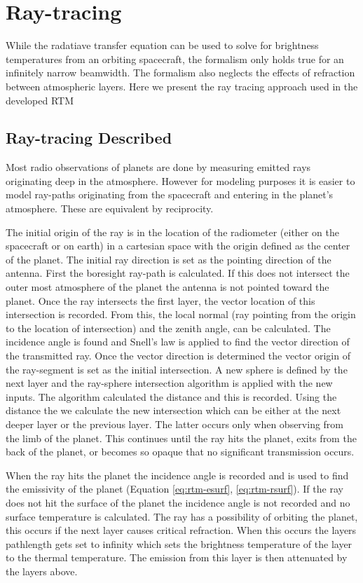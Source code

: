 \section{Ray-tracing}
While the radatiave transfer equation can be used to solve for brightness temperatures from an orbiting spacecraft, the formalism only holds true for an infinitely narrow beamwidth. The formalism also neglects the effects of refraction between atmospheric layers. Here we present the ray tracing approach used in the developed RTM \cite{Hoffman-thesis}
\subsection{Ray-tracing Described}
Most radio observations of planets are done by measuring emitted rays originating deep in the atmosphere. However for modeling purposes it is easier to model ray-paths originating from the spacecraft and entering in the planet's atmosphere. These are equivalent by reciprocity.

The initial origin of the ray is in the location of the radiometer (either on the spacecraft or on earth) in a cartesian space with the origin defined as the center of the planet. The initial ray direction is set as the pointing direction of the antenna. First the boresight ray-path is calculated. If this does not intersect the outer most atmosphere of the planet the antenna is not pointed toward the planet. Once the ray intersects the first layer, the vector location of this intersection is recorded. From this, the local normal (ray pointing from the origin to the location of intersection) and the zenith angle, can be calculated. The incidence angle is found and Snell's law is applied to find the vector direction of the transmitted ray. Once the vector direction is determined the vector origin of the ray-segment is set as the initial intersection. A new sphere is defined by the next layer and the ray-sphere intersection algorithm is applied with the new inputs. The algorithm calculated the distance and this is recorded. Using the distance the we calculate the new intersection which can be either at the next deeper layer or the previous layer. The latter occurs only when observing from the limb of the planet. This continues until the ray hits the planet, exits from the back of the planet, or becomes so opaque that no significant transmission occurs. 

When the ray hits the planet the incidence angle is recorded and is used to find the emissivity of the planet (Equation \ref{eq:rtm-esurf}, \ref{eq:rtm-rsurf}). If the ray does not hit the surface of the planet the incidence angle is not recorded and no surface temperature is calculated. The ray has a possibility of orbiting the planet, this occurs if the next layer causes critical refraction. When this occurs the layers pathlength gets set to infinity which sets the brightness temperature of the layer to the thermal temperature. The emission from this layer is then attenuated by the layers above.

